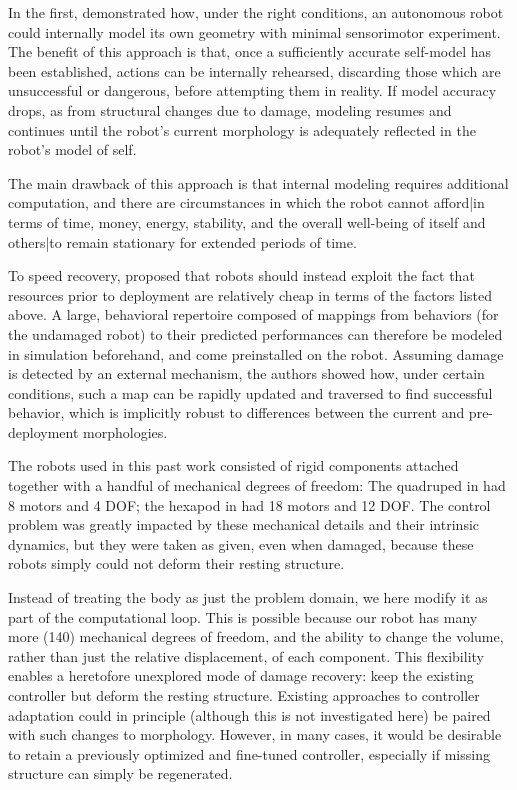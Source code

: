 In the first, \citet{bongard2006resilient} demonstrated how, under the right conditions, an autonomous robot could internally model its own geometry with minimal sensorimotor experiment.
The benefit of this approach is that, once a sufficiently accurate self-model has been established, actions can be internally rehearsed, discarding those which are unsuccessful or dangerous, before attempting them in reality.
If model accuracy drops, as from structural changes due to damage, modeling resumes and continues until the robot's current morphology is adequately reflected in the robot's model of self.

The main drawback of this approach is that internal modeling requires additional computation, and there are circumstances in which the robot cannot afford|in terms of time, money, energy, stability, and the overall well-being of itself and others|to remain stationary for extended periods of time.

To speed recovery, \citet{cully2015robots} proposed that robots should instead exploit the fact that resources prior to deployment are relatively cheap in terms of the factors listed above.
A large, behavioral repertoire composed of mappings from behaviors (for the undamaged robot) to their predicted performances can therefore be modeled in simulation beforehand, and come preinstalled on the robot.
Assuming damage is detected by an external mechanism, the authors showed how, under certain conditions, such a map can be rapidly updated and traversed to find successful behavior, 
which is 
implicitly robust to differences between the current and pre-deployment
morphologies.



The robots used in this past work consisted of rigid components attached together with a handful of mechanical degrees of freedom:
The quadruped in \cite{bongard2006resilient} had 8 motors and 4 DOF; 
the hexapod in \cite{cully2015robots} had 18 motors and 12 DOF.
The control problem was greatly impacted by these mechanical details and their intrinsic dynamics, but they were taken as given, even when damaged, because these robots simply could not deform their resting structure.


Instead of treating the body as just the problem domain, we here modify it as part of the computational loop.
This is possible because our robot has many more (140) mechanical degrees of freedom, and the ability to change the volume, rather than just the relative displacement, of each component.
This flexibility enables a heretofore unexplored mode of damage recovery: keep the existing controller but deform the resting structure.
Existing approaches to controller adaptation could in principle (although this is not investigated here) be paired with such changes to morphology.
However, in many cases, it would be desirable to retain a previously optimized and fine-tuned controller, especially if missing structure can simply be regenerated.

